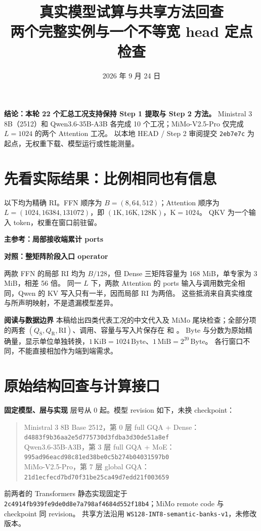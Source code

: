 \documentclass[11pt,a4paper,fontset=fandol]{ctexart}
\title{\bfseries 真实模型试算与共享方法回查\\[5pt]\large 两个完整实例与一个不等宽 head 定点检查}
\author{}\date{2026 年 9 月 24 日}
\newcommand{\qs}{Q_{\mathrm S}}
\newcommand{\qr}{Q_{\mathrm R}}
\newcommand{\RI}{\mathrm{RI}}
\newcommand{\para}[1]{\par\smallskip\noindent\textbf{#1}\quad}
\newcommand{\Byte}{\,\mathrm{Byte}}
\newcommand{\KiB}{\,\mathrm{KiB}}
\newcommand{\MiB}{\,\mathrm{MiB}}
\begin{document}
\maketitle\vspace{-1.6em}
\noindent\textbf{结论：本轮 22 个汇总工况支持保持 Step 1 提取与 Step 2 方法。}
Ministral 3 8B（2512）和 Qwen3.6-35B-A3B 各完成 10 个工况；MiMo-V2.5-Pro 仅完成 $L=1024$ 的两个 Attention 工况。
以本地 HEAD / Step 2 审阅提交 \texttt{2eb7e7c} 为起点，无权重下载、模型运行或性能测量。

\section{先看实际结果：比例相同也有信息}
以下均为精确 RI。FFN 顺序为 $B=(8,64,512)$；Attention 顺序为
$L=(1024,16384,131072)$，即 $(1\mathrm K,16\mathrm K,128\mathrm K)$，$\mathrm K=1024$。
QKV 为一个输入 token，权重在窗口前驻留。

\para{主参考：局部接收端累计 ports}
\begin{center}\small\end{center}
\para{对照：整矩阵阶段入口 operator}
\begin{center}\small\end{center}

两款 FFN 的局部 RI 均为 $B/128$，但 Dense 三矩阵容量为 168 MiB，单专家为 3 MiB，相差 56 倍。
同一 $L$ 下，两款 Attention 的 ports 输入与调用数完全相同，Qwen 的 KV 写入只有一半，因而局部 RI 为两倍。
这些抵消来自真实维度与所声明映射，不是遗漏模型差异。

\para{阅读与数据边界}
本稿给出四类代表工况的中文代入及 MiMo 尾块检查；全部分项的两套
$(\qs,\qr,\RI)$、调用、容量与写入片保存在  和 。
Byte 与分数为原始精确量，显示单位单独转换，$1\KiB=1024\Byte$、$1\MiB=2^{20}\Byte$。
各行窗口不同，不能直接相加作为端到端需求。

\clearpage
\section{原始结构回查与计算接口}
\para{固定模型、层与实现}
层号从 0 起。模型 revision 如下，未换 checkpoint：
\begin{quote}\small
Ministral 3 8B Base 2512，第 0 层 full GQA + Dense：\\
\texttt{d4883f9b36aa2e5d775730d3fdba3d30de51a8ef}\\
Qwen3.6-35B-A3B，第 3 层 full GQA + MoE：\\
\texttt{995ad96eacd98c81ed38be0c5b274b04031597b0}\\
MiMo-V2.5-Pro，第 7 层 global GQA：\\
\texttt{21d1ecfecd7bd70f31be25ca49d7edd21f003659}
\end{quote}
前两者的 Transformers 静态实现固定于
\texttt{2c4914fb939fe9de0d8e7a798af4684d552f18b4}；MiMo remote code 与 checkpoint 同 revision。
共享方法沿用 \texttt{WS128-INT8-semantic-banks-v1}，未修改版本。
\end{document}
